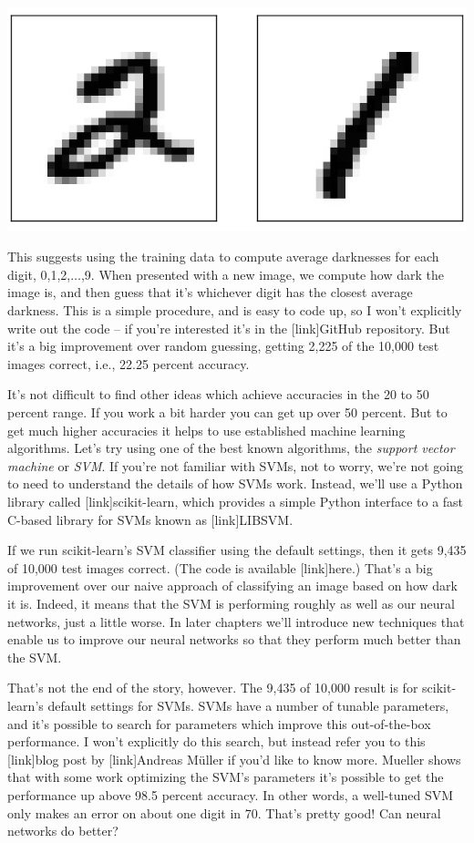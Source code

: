 \documentclass[a4paper,twoside,10pt]{book}
\begin{document}
\begin{center}
	\includegraphics[scale=0.25]{./figures/ch1/mnist_2_and_1}
\end{center}
This suggests using the training data to compute average darknesses for each digit, 0,1,2,$\ldots$,9. When presented with a new image, we compute how dark the image is, and then guess that it's whichever digit has the closest average darkness. This is a simple procedure, and is easy to code up, so I won't explicitly write out the code -- if you're interested it's in the [link]GitHub repository. But it's a big improvement over random guessing, getting 2,225 of the 10,000 test images correct, i.e., 22.25 percent accuracy.


It's not difficult to find other ideas which achieve accuracies in the 20 to 50 percent range. If you work a bit harder you can get up over 50 percent. But to get much higher accuracies it helps to use established machine learning algorithms. Let's try using one of the best known algorithms, the \textit{support vector machine} or \textit{SVM}. If you're not familiar with SVMs, not to worry, we're not going to need to understand the details of how SVMs work. Instead, we'll use a Python library called [link]scikit-learn, which provides a simple Python interface to a fast C-based library for SVMs known as [link]LIBSVM.

If we run scikit-learn's SVM classifier using the default settings, then it gets 9,435 of 10,000 test images correct. (The code is available [link]here.) That's a big improvement over our naive approach of classifying an image based on how dark it is. Indeed, it means that the SVM is performing roughly as well as our neural networks, just a little worse. In later chapters we'll introduce new techniques that enable us to improve our neural networks so that they perform much better than the SVM.

That's not the end of the story, however. The 9,435 of 10,000 result is for scikit-learn's default settings for SVMs. SVMs have a number of tunable parameters, and it's possible to search for parameters which improve this out-of-the-box performance. I won't explicitly do this search, but instead refer you to this [link]blog post by [link]Andreas M\"{u}ller if you'd like to know more. Mueller shows that with some work optimizing the SVM's parameters it's possible to get the performance up above 98.5 percent accuracy. In other words, a well-tuned SVM only makes an error on about one digit in 70. That's pretty good! Can neural networks do better?
\end{document}
